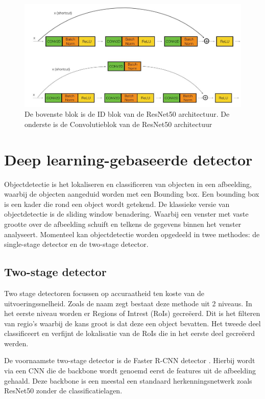 \begin{figure}[!ht]
	\centering
	\includegraphics[width=1.0\linewidth]{fig/resnet_blokken.jpg}
	\caption{De bovenste blok is de ID blok van de ResNet50 architectuur. De onderste is de Convolutieblok van de ResNet50 architectuur}
	\label{fig:resnet_b}
\end{figure}

\section{Deep learning-gebaseerde detector}
Objectdetectie is het lokaliseren en classificeren van objecten in een afbeelding, waarbij de objecten aangeduid worden met een Bounding box.
Een bounding box is een kader die rond een object wordt getekend. 
De klassieke versie van objectdetectie is de sliding window benadering.
Waarbij een venster met vaste grootte over de afbeelding schuift en telkens de gegevens binnen het venster analyseert.
Momenteel kan objectdetectie worden opgedeeld in twee methodes: de single-stage detector en de two-stage detector.

\subsection{Two-stage detector}
Two stage detectoren focussen op accuraatheid ten koste van de uitvoeringssnelheid.
Zoals de naam zegt bestaat deze methode uit 2 niveaus. 
In het eerste niveau worden er Regions of Intrest (RoIs) gecre\"eerd.
Dit is het filteren van regio's waarbij de kans groot is dat deze een object bevatten. 
Het tweede deel classificeert en verfijnt de lokalisatie van de RoIs die in het eerste deel gecre\"eerd werden. 

De voornaamste two-stage detector is de Faster R-CNN detector \cite{ren_faster_2016}. 
Hierbij wordt via een CNN die de backbone wordt genoemd eerst de features uit de afbeelding gehaald.
Deze backbone is een meestal een standaard herkenningsnetwerk zoals ResNet50 zonder de classificatielagen.

